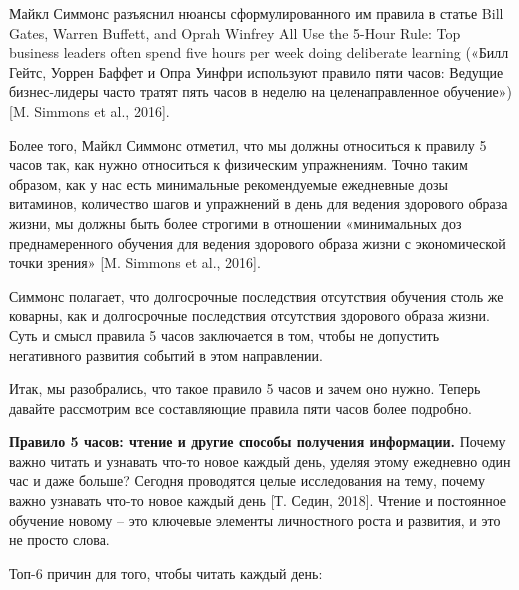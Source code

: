 Майкл Симмонс разъяснил нюансы сформулированного им правила в статье Bill Gates, Warren Buffett, and Oprah Winfrey All Use the 5-Hour Rule: Top business leaders often spend five hours per week doing deliberate learning («Билл Гейтс, Уоррен Баффет и Опра Уинфри используют правило пяти часов: Ведущие бизнес-лидеры часто тратят пять часов в неделю на целенаправленное обучение») [M. Simmons et al., 2016].

Более того, Майкл Симмонс отметил, что мы должны относиться к правилу 5 часов так, как нужно относиться к физическим упражнениям. Точно таким образом, как у нас есть минимальные рекомендуемые ежедневные дозы витаминов, количество шагов и упражнений в день для ведения здорового образа жизни, мы должны быть более строгими в отношении «минимальных доз преднамеренного обучения для ведения здорового образа жизни с экономической точки зрения» [M. Simmons et al., 2016].

Симмонс полагает, что долгосрочные последствия отсутствия обучения столь же коварны, как и долгосрочные последствия отсутствия здорового образа жизни. Суть и смысл правила 5 часов заключается в том, чтобы не допустить негативного развития событий в этом направлении.

Итак, мы разобрались, что такое правило 5 часов и зачем оно нужно. Теперь давайте рассмотрим все составляющие правила пяти часов более подробно.

\textbf{Правило 5 часов: чтение и другие способы получения информации.}
Почему важно читать и узнавать что-то новое каждый день, уделяя этому ежедневно один час и даже больше? Сегодня проводятся целые исследования на тему, почему важно узнавать что-то новое каждый день [Т. Седин, 2018]. Чтение и постоянное обучение новому – это ключевые элементы личностного роста и развития, и это не просто слова.

Топ-6 причин для того, чтобы читать каждый день:

